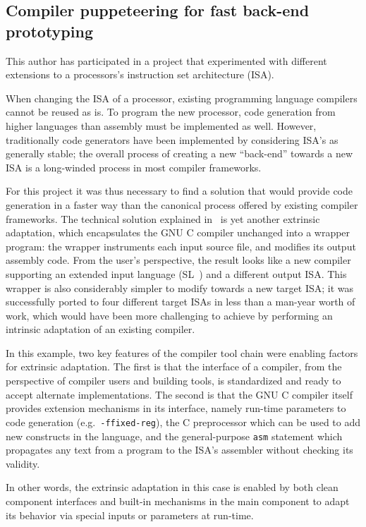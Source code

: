 \documentclass[a4paper]{article}
\newcommand{\eg}{e.g.~}
\begin{document}
\subsection{Compiler puppeteering for fast back-end prototyping}

This author has participated in a project that experimented with
different extensions to a processors's instruction set architecture
(ISA).

When changing the ISA of a processor, existing programming
language compilers cannot be reused as is. To program the new
processor, code generation from higher languages than assembly must be
implemented as well. However, traditionally code generators have been
implemented by considering ISA's as generally stable; the overall
process of creating a new ``back-end'' towards a new ISA is a
long-winded process in most compiler frameworks.

For this project it was thus necessary to find a solution that would
provide code generation in a faster way than the canonical process
offered by existing compiler frameworks. The technical solution
explained in~\cite[App.~H]{poss.12} is yet another extrinsic
adaptation, which encapsulates the GNU C compiler unchanged into a
wrapper program: the wrapper instruments each input source file, and
modifies its output assembly code. From the user's perspective, the
result looks like a new compiler supporting an
extended input language (SL~\cite{poss.12.sl}) and a different output
ISA. This wrapper is also considerably simpler to modify towards a new
target ISA; it was successfully ported to four different target ISAs
in less than a man-year worth of work, which would have been more
challenging to achieve by performing an intrinsic adaptation of an
existing compiler.

In this example, two key features of the compiler tool chain were
enabling factors for extrinsic adaptation. The first is that the
interface of a compiler, from the perspective of compiler users and
building tools, is standardized and ready to accept alternate
implementations. The second is that the GNU C compiler itself provides
extension mechanisms in its interface, namely run-time parameters to
code generation (\eg \texttt{-ffixed-reg}), the C preprocessor which
can be used to add new constructs in the language, and the
general-purpose \texttt{asm} statement which propagates any text from
a program to the ISA's assembler without checking its validity.

In other words, the extrinsic adaptation in this case is enabled by
both clean component interfaces and built-in mechanisms in the main
component to adapt its behavior via special inputs or parameters at
run-time.
\end{document}
